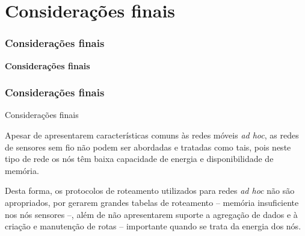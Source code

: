 \documentclass[notes]{beamer}
\begin{document}
\section{Considerações finais}
\begin{frame}
\label{slide_75}
\frametitle{Considerações finais}

\begin{block}

 \center \textbf{Considerações finais}

\end{block}

\end{frame}

\begin{frame}
\label{slide_76}
\frametitle{Considerações finais}

\begin{block}{Considerações finais}

Apesar de apresentarem características comuns às redes móveis \textit{ad hoc}, as redes de sensores sem fio não podem ser abordadas e tratadas como tais, pois neste tipo de rede os nós têm baixa capacidade de energia e disponibilidade de memória.
\end{block} \pause

\begin{block}

Desta forma, os protocolos de roteamento utilizados para redes \textit{ad hoc} não são apropriados, por gerarem grandes tabelas de roteamento – memória insuficiente nos nós sensores –, além de não apresentarem suporte a agregação de dados e à criação e manutenção de rotas – importante quando se trata da energia dos nós.  

\end{block} 

\end{frame}
\end{document}
